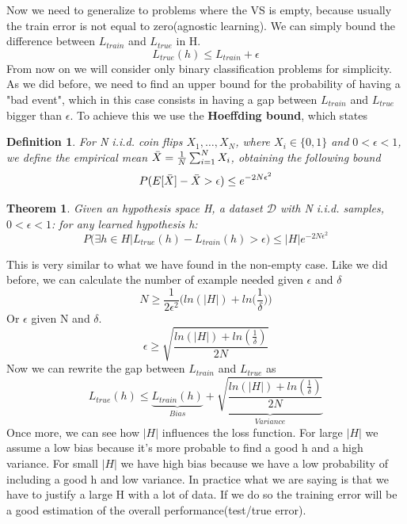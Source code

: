 \documentclass[main.tex]{subfiles}
\newtheorem{theorem}{Theorem}[section] %
\newtheorem{definition}{Definition}[section]
\begin{document}
Now we need to generalize to problems where the VS is empty, because usually the train error is not equal to zero(agnostic learning). We can simply bound the difference between $L_{train}$ and $L_{true}$ in H.
\begin{equation*}
    L_{true}(h) \leq L_{train} + \epsilon
\end{equation*}
From now on we will consider only binary classification problems for simplicity. As we did before, we need to find an upper bound for the probability of having a "bad event", which in this case consists in having a gap between $L_{train}$ and $L_{true}$ bigger than $\epsilon$. To achieve this we use the \textbf{Hoeffding bound}, which states 
\begin{definition}
For N i.i.d. coin flips $X_1, \dots, X_N$, where $X_i \in \{0,1\}$ and $0 < \epsilon < 1$, we define the empirical mean $\Bar{X}=\frac{1}{N}\sum_{i=1}^N X_i$, obtaining the following bound
\begin{equation*}
    P(E[\Bar{X}]-\Bar{X} > \epsilon) \leq e^{-2N\epsilon^2}
\end{equation*}
\end{definition}
\begin{theorem}
Given an hypothesis space H, a dataset $\mathcal{D}$ with N i.i.d. samples, $0< \epsilon <1$: for any learned hypothesis h:
\begin{equation*}
    P(\exists h \in H | L_{true}(h)-L_{train}(h) > \epsilon) \leq |H|e^{-2N \epsilon^2}
\end{equation*}
\end{theorem}
This is very similar to what we have found in the non-empty case. Like we did before, we can calculate the number of example needed given $\epsilon$ and $\delta$ 
\begin{equation*}
    N \geq \frac{1}{2 \epsilon^2} \bigg( ln(|H|) + ln\bigg( \frac{1}{\delta} \bigg) \bigg)
\end{equation*}
Or $\epsilon$ given N and $\delta$.
\begin{equation*}
    \epsilon \geq \sqrt{\frac{ln(|H|) + ln( \frac{1}{\delta} )}{2N}}
\end{equation*}
Now we can rewrite the gap between $L_{train}$ and $L_{true}$ as
\begin{equation}
    L_{true}(h) \leq \underbrace{L_{train}(h)}_{Bias} + \underbrace{\sqrt{\frac{ln(|H|) + ln( \frac{1}{\delta} )}{2N}}}_{Variance}
\end{equation}
Once more, we can see how $|H|$ influences the loss function. For large $|H|$ we assume a low bias because it's more probable to find a good h and a high variance. For small $|H|$ we have high bias because we have a low probability of including a good h and low variance. In practice what we are saying is that we have to justify a large H with a lot of data. If we do so the training error will be a good estimation of the overall performance(test/true error).
\end{document}
